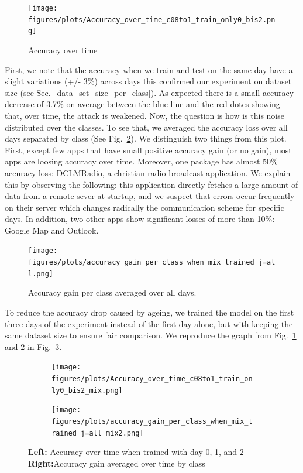 \begin{figure}[H]
 \centering
 \texttt{[image: figures/plots/Accuracy\_over\_time\_c08to1\_train\_only0\_bis2.png]}
 \caption{Accuracy over time }
 \label{fig:accuracy over time}
\end{figure}

\newpage

First, we note that the accuracy when we train and test on the same day have a slight variations (+/- 3\%) across days this confirmed our experiment on dataset size (see Sec.~\ref{data_set_size_per_class}). As expected there is a small accuracy decrease of 3.7\% on average between the blue line and the red dotes showing that, over time, the attack is weakened. Now, the question is how is this noise distributed over the classes. To see that, we averaged the accuracy loss over all days separated by class (See Fig.~\ref{fig:acc gain overtime}). We distinguish two things from this plot. First, except few apps that have small positive accuracy gain (or no gain), most apps are loosing accuracy over time. Moreover, one package has almost 50\% accuracy loss: DCLMRadio, a christian radio broadcast application. We explain this by observing the following: this application directly fetches a large amount of data from a remote sever at startup, and we suspect that errors occur frequently on their server which changes radically the communication scheme for specific days. In addition, two other apps show significant losses of more than 10\%: Google Map and Outlook.
\\
\begin{figure}[ht]
 \centering
 \texttt{[image: figures/plots/accuracy\_gain\_per\_class\_when\_mix\_trained\_j=all.png]}
 \caption{Accuracy gain per class averaged over all days.}
  \label{fig:acc gain overtime}
\end{figure}

To reduce the accuracy drop caused by ageing, we trained the model on the first three days of the experiment instead of the first day alone, but with keeping the same dataset size to ensure fair comparison. We reproduce the graph from Fig.~\ref{fig:accuracy over time} and \ref{fig:acc gain overtime} in Fig.~\ref{fig:learning extension over time}.


\begin{figure}[h]
\centering
\begin{subfigure}{.5\textwidth}
  \centering
  \texttt{[image: figures/plots/Accuracy\_over\_time\_c08to1\_train\_only0\_bis2\_mix.png]}
\end{subfigure}%
\begin{subfigure}{.5\textwidth}
  \centering
  \texttt{[image: figures/plots/accuracy\_gain\_per\_class\_when\_mix\_trained\_j=all\_mix2.png]}
\end{subfigure}
\caption{\textbf{Left:} Accuracy over time when trained with day 0, 1, and 2 \textbf{Right:}Accuracy gain averaged over time by class}
\label{fig:learning extension over time}
\end{figure}

